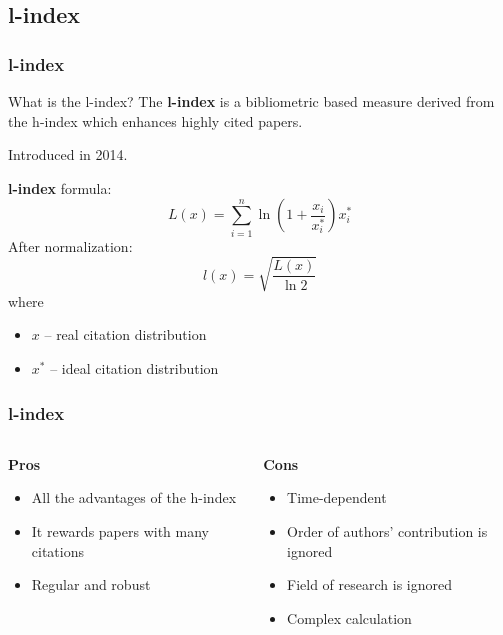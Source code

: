 \documentclass{beamer}
\newcommand{\pros}{\item[{\textcolor[HTML]{3C8031}{\ding{51}}}]}
\newcommand{\cons}{\item[\textcolor{red}{\ding{54}}]}
\begin{document}
\subsection{l-index}
\begin{frame}
    \frametitle{l-index}
    \begin{block}{What is the l-index?}
        The \textbf{l-index}\cite{lando2014new} is a bibliometric based measure
        derived from the h-index which enhances highly cited papers.
    \end{block}

    \begin{alertblock}{}
        Introduced in 2014.
    \end{alertblock}

    \textbf{l-index} formula:
    \[
        L(x) = \sum\limits_{i=1}^n \ln \left( 1 + \frac{x_i}{x_i^*} \right) x_i^*
    \]
    After normalization:
    \[
        l(x) = \sqrt{\frac{L(x)}{\ln 2}}
    \]
    where
    \begin{itemize}
        \item $x$ -- real citation distribution
        \item $x^*$ -- ideal citation distribution
    \end{itemize}
\end{frame}
\begin{frame}
    \frametitle{l-index}
    \begin{columns}[T]
        \begin{column}{.5\textwidth}
            \centering \textbf{Pros}
            \begin{itemize}[<+->]
                \pros All the advantages of the h-index
                \pros It rewards papers with many citations
                \pros Regular and robust
            \end{itemize}
        \end{column}
        \begin{column}{.5\textwidth}
            \centering \textbf{Cons}
            \begin{itemize}[<+->]
                \cons Time-dependent
                \cons Order of authors' contribution is ignored
                \cons Field of research is ignored
                \cons Complex calculation
            \end{itemize}
        \end{column}
    \end{columns}
\end{frame}
\end{document}
